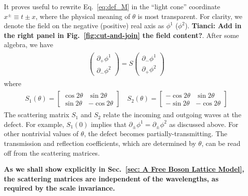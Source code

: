 It proves useful to rewrite Eq.~\eqref{eq:def_M} in the ``light cone'' coordinate $x^\pm\equiv t\pm x$, where the physical meaning of $\theta$ is most transparent. For clarity, we denote the field on the negative (positive) real axis as $\phi^1$ ($\phi^2$). {\bf\color{red}Tianci: Add in the right panel in Fig.~\ref{fig:cut-and-join} the field content?}. After some algebra, we have
\begin{eqnarray}\begin{aligned}
\label{eq:def_S}
\begin{pmatrix}
\partial_+\phi^1\\
\partial_-\phi^2
\end{pmatrix}
=S
\begin{pmatrix}
\partial_-\phi^1\\
\partial_+\phi^2
\end{pmatrix}
\end{aligned}\end{eqnarray}
where 
\begin{eqnarray}\begin{aligned}
\label{eq:S1_S2}
S_1(\theta)=\begin{bmatrix}
\cos 2\theta & \sin 2\theta \\
\sin 2\theta & -\cos 2\theta
\end{bmatrix}\quad
S_2(\theta)=\begin{bmatrix}
-\cos 2\theta & \sin 2\theta \\
-\sin 2\theta & -\cos 2\theta
\end{bmatrix}
\end{aligned}\end{eqnarray}
The scattering matrix $S_1$ and $S_2$ relate the incoming and outgoing waves at the defect. For example, $S_1(0)$ implies that $\partial_\pm\phi^{1}=\partial_\pm\phi^{2}$ as discussed above. For other nontrivial values of $\theta$, the defect becomes partially-transmitting. The transmission and reflection coefficients, which are determined by $\theta$, can be read off from the scattering matrices.

{\bf\color{red}As we shall show explicitly in Sec.~\ref{sec: A Free Boson Lattice Model}, the scattering matrices are independent of the wavelengths, as required by the scale invariance.}

